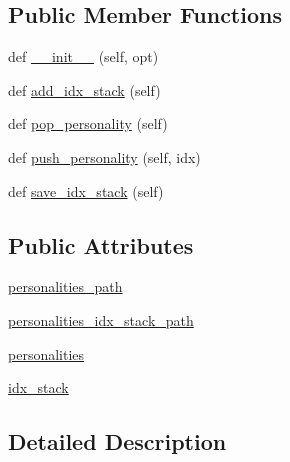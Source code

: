 \subsection*{Public Member Functions}
\begin{DoxyCompactItemize}
\item 
def \hyperlink{classimage__chat__collection_1_1worlds_1_1PersonalityGenerator_aea4fe82298d9fea4e7b20b3380a47c99}{\+\_\+\+\_\+init\+\_\+\+\_\+} (self, opt)
\item 
def \hyperlink{classimage__chat__collection_1_1worlds_1_1PersonalityGenerator_a53113dc205f282b68fb601bb4f1b094e}{add\+\_\+idx\+\_\+stack} (self)
\item 
def \hyperlink{classimage__chat__collection_1_1worlds_1_1PersonalityGenerator_ad35601df7a905c1e043c6fb1117db74e}{pop\+\_\+personality} (self)
\item 
def \hyperlink{classimage__chat__collection_1_1worlds_1_1PersonalityGenerator_afbcf297c74564898b5c96d29c017c7b1}{push\+\_\+personality} (self, idx)
\item 
def \hyperlink{classimage__chat__collection_1_1worlds_1_1PersonalityGenerator_a19645254b8da82832d6bcb0825119c65}{save\+\_\+idx\+\_\+stack} (self)
\end{DoxyCompactItemize}
\subsection*{Public Attributes}
\begin{DoxyCompactItemize}
\item 
\hyperlink{classimage__chat__collection_1_1worlds_1_1PersonalityGenerator_a1d40759bb3feb63f32181b1b623437d2}{personalities\+\_\+path}
\item 
\hyperlink{classimage__chat__collection_1_1worlds_1_1PersonalityGenerator_a7d2134cba68716b4483d31741497c85e}{personalities\+\_\+idx\+\_\+stack\+\_\+path}
\item 
\hyperlink{classimage__chat__collection_1_1worlds_1_1PersonalityGenerator_ad34d454740fa68cf23f3d35121fc92c6}{personalities}
\item 
\hyperlink{classimage__chat__collection_1_1worlds_1_1PersonalityGenerator_acbfcdffd779cc5be94fb47154c770c8a}{idx\+\_\+stack}
\end{DoxyCompactItemize}


\subsection{Detailed Description}


